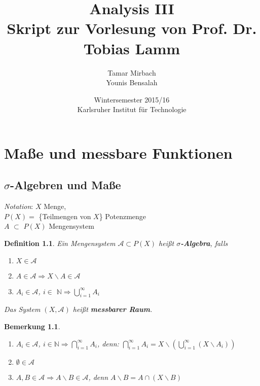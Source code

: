 \documentclass[11pt]{memoir}
\theoremstyle{changebreak}
\newtheorem{Definition}{Definition}[chapter]
\newtheorem{Bemerkung}{Bemerkung}[chapter]
\begin{document}
\title{\textbf{Analysis III}\\ Skript zur Vorlesung von Prof. Dr. Tobias Lamm}
\author{Tamar Mirbach\\ Younis Bensalah}
\date{Wintersemester 2015/16\\ Karlsruher Institut für Technologie}

\maketitle

\chapter{Maße und messbare Funktionen}
\section{$\sigma$-Algebren und Maße}


\emph{Notation}: $X$ Menge, \\ $P(X) =$ \{Teilmengen von $X$\}  \; Potenzmenge \\
$A$ $\subset$  $P(X)$ Mengensystem

\begin{Definition}
Ein Mengensystem $\mathscr{A} \subset P(X)$ heißt \textbf{$\sigma$-Algebra}, falls
\begin{enumerate}
	\item $X \in \mathscr{A}$
	\item $A \in \mathscr{A} \Rightarrow X \backslash A \in \mathscr{A}$
	\item $A_i \in \mathscr{A}$, $i \in$ $\mathbb{N} \Rightarrow \bigcup_{i = 1}^{\infty} A_i$
\end{enumerate}
Das System $(X, \mathscr{A})$ heißt \textbf{messbarer Raum}.
\end{Definition}

\begin{Bemerkung}
\begin{enumerate}
	\item $A_i \in \mathscr{A}$, $i \in \mathbb{N} \Rightarrow \bigcap_{i = 1}^{\infty} A_i$, \quad denn:
	$\bigcap_{i=1}^{\infty} A_i  = X \backslash \left(\bigcup_{i=1}^{\infty} (X \backslash A_i)\right)$
	\item $\emptyset \in \mathscr{A}$
	\item $A, B \in \mathscr{A} \Rightarrow A \backslash B \in \mathscr{A}$, denn $A \backslash B = A \cap (X \backslash B)$
\end{enumerate}
\end{Bemerkung}
\end{document}
